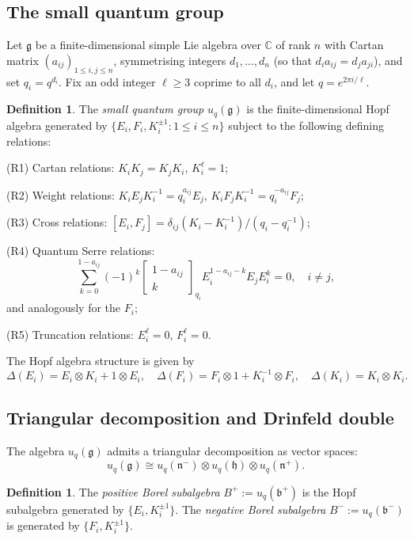 \documentclass[11pt,letterpaper]{amsart}
\theoremstyle{plain}
\theoremstyle{definition}
\newtheorem{definition}[theorem]{Definition}
\theoremstyle{remark}
\newcommand{\CC}{\mathbb{C}}
\newcommand{\bplus}{B^{+}}
\newcommand{\bminus}{B^{-}}
\begin{document}
\subsection{The small quantum group}

Let $\mathfrak{g}$ be a finite-dimensional simple Lie algebra over $\CC$ of rank $n$ with Cartan matrix $(a_{ij})_{1 \leq i,j \leq n}$, symmetrising integers $d_1, \ldots, d_n$ (so that $d_i a_{ij} = d_j a_{ji}$), and set $q_i = q^{d_i}$. Fix an odd integer $\ell \geq 3$ coprime to all $d_i$, and let $q = e^{2\pi i/\ell}$.

\begin{definition}
The \emph{small quantum group} $u_q(\mathfrak{g})$ is the finite-dimensional Hopf algebra generated by $\{E_i, F_i, K_i^{\pm 1} : 1 \leq i \leq n\}$ subject to the following defining relations:

\textup{(R1)} Cartan relations: $K_i K_j = K_j K_i$, $K_i^\ell = 1$;

\textup{(R2)} Weight relations: $K_i E_j K_i^{-1} = q_i^{a_{ij}} E_j$, $K_i F_j K_i^{-1} = q_i^{-a_{ij}} F_j$;

\textup{(R3)} Cross relations: $[E_i, F_j] = \delta_{ij} (K_i - K_i^{-1})/(q_i - q_i^{-1})$;

\textup{(R4)} Quantum Serre relations:
\[
\sum_{k=0}^{1-a_{ij}} (-1)^k \begin{bmatrix} 1-a_{ij} \\ k \end{bmatrix}_{q_i} E_i^{1-a_{ij}-k} E_j E_i^k = 0, \quad i \neq j,
\]
and analogously for the $F_i$;

\textup{(R5)} Truncation relations: $E_i^\ell = 0$, $F_i^\ell = 0$.
\end{definition}

The Hopf algebra structure is given by
\[
\Delta(E_i) = E_i \otimes K_i + 1 \otimes E_i, \quad \Delta(F_i) = F_i \otimes 1 + K_i^{-1} \otimes F_i, \quad \Delta(K_i) = K_i \otimes K_i.
\]

\subsection{Triangular decomposition and Drinfeld double}

The algebra $u_q(\mathfrak{g})$ admits a triangular decomposition as vector spaces:
\[
u_q(\mathfrak{g}) \cong u_q(\mathfrak{n}^-) \otimes u_q(\mathfrak{h}) \otimes u_q(\mathfrak{n}^+).
\]

\begin{definition}
The \emph{positive Borel subalgebra} $\bplus := u_q(\mathfrak{b}^+)$ is the Hopf subalgebra generated by $\{E_i, K_i^{\pm 1}\}$. The \emph{negative Borel subalgebra} $\bminus := u_q(\mathfrak{b}^-)$ is generated by $\{F_i, K_i^{\pm 1}\}$.
\end{definition}
\end{document}
